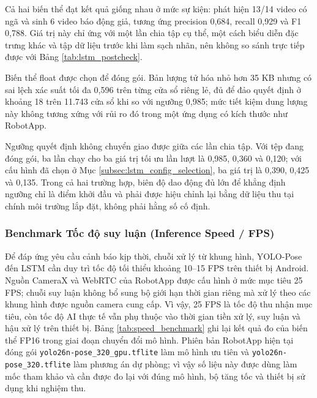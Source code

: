 Cả hai biến thể đạt kết quả giống nhau ở mức sự kiện: phát hiện 13/14 video có ngã và sinh 6 video báo động giả, tương ứng precision 0,684, recall 0,929 và F1 0,788. Giá trị này chỉ ứng với một lần chia tập cụ thể, một cách biểu diễn đặc trưng khác và tập dữ liệu trước khi làm sạch nhãn, nên không so sánh trực tiếp được với Bảng \ref{tab:lstm_postcheck}.

Biến thể float được chọn để đóng gói. Bản lượng tử hóa nhỏ hơn 35 KB nhưng có sai lệch xác suất tối đa 0,596 trên từng cửa sổ riêng lẻ, đủ để đảo quyết định ở khoảng 18 trên 11.743 cửa sổ khi so với ngưỡng 0,985; mức tiết kiệm dung lượng này không tương xứng với rủi ro đó trong một ứng dụng có kích thước như RobotApp.

Ngưỡng quyết định không chuyển giao được giữa các lần chia tập. Với tệp đang đóng gói, ba lần chạy cho ba giá trị tối ưu lần lượt là 0,985, 0,360 và 0,120; với cấu hình đã chọn ở Mục \ref{subsec:lstm_config_selection}, ba giá trị là 0,390, 0,425 và 0,135. Trong cả hai trường hợp, biên độ dao động đủ lớn để khẳng định ngưỡng chỉ là điểm khởi đầu và phải được hiệu chỉnh lại bằng dữ liệu thu tại chính môi trường lắp đặt, không phải hằng số cố định.

\subsubsection{Benchmark Tốc độ suy luận (Inference Speed / FPS)}

Để đáp ứng yêu cầu cảnh báo kịp thời, chuỗi xử lý từ khung hình, YOLO-Pose đến LSTM cần duy trì tốc độ tối thiểu khoảng 10--15 FPS trên thiết bị Android. Nguồn CameraX và WebRTC của RobotApp được cấu hình ở mức mục tiêu 25 FPS; chuỗi suy luận không bổ sung bộ giới hạn thời gian riêng mà xử lý theo các khung hình được nguồn camera cung cấp. Vì vậy, 25 FPS là tốc độ thu nhận mục tiêu, còn tốc độ AI thực tế vẫn phụ thuộc vào thời gian tiền xử lý, suy luận và hậu xử lý trên thiết bị. Bảng \ref{tab:speed_benchmark} ghi lại kết quả đo của biến thể FP16 trong giai đoạn chuyển đổi mô hình. Phiên bản RobotApp hiện tại đóng gói \texttt{yolo26n-pose\_320\_gpu.tflite} làm mô hình ưu tiên và \texttt{yolo26n-pose\_320.tflite} làm phương án dự phòng; vì vậy số liệu này được dùng làm mốc tham khảo và cần được đo lại với đúng mô hình, bộ tăng tốc và thiết bị sử dụng khi nghiệm thu.

